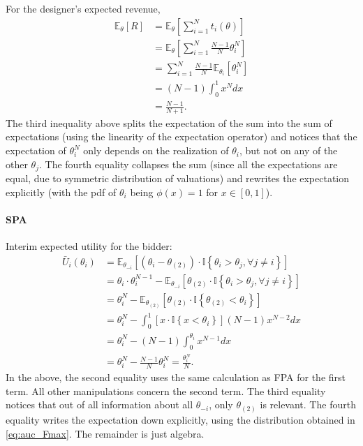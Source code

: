 \documentclass[a4paper]{article}
\begin{document}
For the designer's expected revenue,
\begin{align*}
	\mathbb{E}_\theta [R]
	&= \mathbb{E}_\theta \left[ \sum_{i=1}^N t_i(\theta) \right]
	\\
	&= \mathbb{E}_\theta \left[ \sum_{i=1}^N \frac{N-1}{N} \theta_i^N \right]
	\\
	&= \sum_{i=1}^N \frac{N-1}{N} \mathbb{E}_{\theta_i} \left[ \theta_i^N \right]
	\\
	&= (N-1) \int_0^1 x^N dx
	\\
	&= \frac{N-1}{N+1}.
\end{align*}
The third inequality above splits the expectation of the sum into the sum of expectations (using the linearity of the expectation operator) and notices that the expectation of $\theta_i^N$ only depends on the realization of $\theta_i$, but not on any of the other $\theta_j$. The fourth equality collapses the sum (since all the expectations are equal, due to symmetric distribution of valuations) and rewrites the expectation explicitly (with the pdf of $\theta_i$ being $\phi(x)=1$ for $x \in [0,1]$).


\paragraph*{SPA}
Interim expected utility for the bidder:
\begin{align*}
	\bar{U}_i(\theta_i) &= \mathbb{E}_{\theta_{-i}} \left[ \left( \theta_i - \theta_{(2)} \right) \cdot \mathbb{I} \left\{ \theta_i > \theta_j, \forall j \neq i \right\} \right]
	\\
	&= \theta_i \cdot \theta_i^{N-1} - \mathbb{E}_{\theta_{-i}} \left[ \theta_{(2)} \cdot \mathbb{I} \left\{ \theta_i > \theta_j, \forall j \neq i \right\} \right]
	\\
	&= \theta_i^N - \mathbb{E}_{\theta_{(2)}} \left[ \theta_{(2)} \cdot \mathbb{I} \left\{ \theta_{(2)} < \theta_i \right\} \right]
	\\
	&= \theta_i^N - \int_0^1 \left[ x \cdot \mathbb{I} \left\{ x < \theta_i \right\} \right] (N-1)x^{N-2} dx
	\\
	&=\theta_i^N - (N-1) \int_0^{\theta_i} x^{N-1} dx
	\\
	&=\theta_i^N - \frac{N-1}{N} \theta_i^N = \frac{\theta_i^N}{N}.
\end{align*}
In the above, the second equality uses the same calculation as FPA for the first term. All other manipulations concern the second term. The third equality notices that out of all information about all $\theta_{-i}$, only $\theta_{(2)}$ is relevant. The fourth equality writes the expectation down explicitly, using the distribution obtained in \eqref{eq:auc_Fmax}. The remainder is just algebra.
\end{document}
